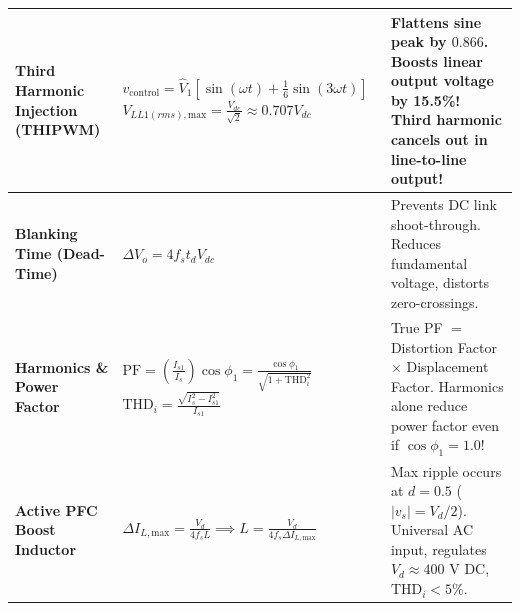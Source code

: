 \documentclass[11pt,a4paper]{article}
\begin{document}
\begin{table}[htbp]
\begin{tabularx}{\textwidth}{l p{5.5cm} X}
\midrule
\textbf{Third Harmonic Injection (THIPWM)} &
$v_{\text{control}} = \hat{V}_1 [\sin(\omega t) + \frac{1}{6}\sin(3\omega t)]$ \newline
$V_{LL1(rms),\text{max}} = \frac{V_{dc}}{\sqrt{2}} \approx 0.707 V_{dc}$ &
Flattens sine peak by $0.866$. \newline
\textbf{Boosts linear output voltage by 15.5\%!} \newline
Third harmonic cancels out in line-to-line output! \\
\midrule
\textbf{Blanking Time (Dead-Time)} &
$\Delta V_o = 4 f_s t_d V_{dc}$ &
Prevents DC link shoot-through. \newline
Reduces fundamental voltage, distorts zero-crossings. \\
\midrule
\textbf{Harmonics \& Power Factor} &
$\text{PF} = \left(\frac{I_{s1}}{I_s}\right) \cos\phi_1 = \frac{\cos\phi_1}{\sqrt{1 + \text{THD}_i^2}}$ \newline
$\text{THD}_i = \frac{\sqrt{I_s^2 - I_{s1}^2}}{I_{s1}}$ &
True PF $=$ Distortion Factor $\times$ Displacement Factor. \newline
Harmonics alone reduce power factor even if $\cos\phi_1 = 1.0$! \\
\midrule
\textbf{Active PFC Boost Inductor} &
$\Delta I_{L,\text{max}} = \frac{V_d}{4 f_s L} \implies L = \frac{V_d}{4 f_s \Delta I_{L,\text{max}}}$ &
Max ripple occurs at $d=0.5$ ($|v_s| = V_d/2$). \newline
Universal AC input, regulates $V_d \approx 400\text{ V}$ DC, $\text{THD}_i < 5\%$. \\
\bottomrule
\end{tabularx}
\end{table}
\end{document}
